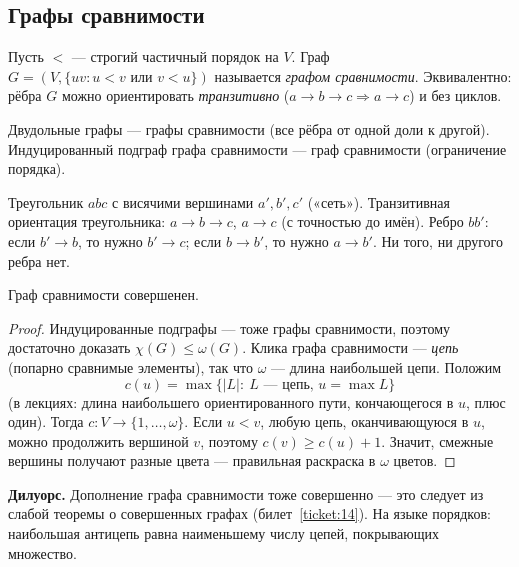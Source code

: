 \subsection*{Графы сравнимости}
\begin{definition}
Пусть \(<\) — строгий частичный порядок на \(V\). Граф \(G=(V,\{uv: u<v\text{ или }v<u\})\)
называется \emph{графом сравнимости}. Эквивалентно: рёбра \(G\) можно ориентировать
\emph{транзитивно} (\(a\to b\to c\Rightarrow a\to c\)) и без циклов.
\end{definition}
Двудольные графы — графы сравнимости (все рёбра от одной доли к другой).
Индуцированный подграф графа сравнимости — граф сравнимости (ограничение порядка).

\begin{example}
Треугольник \(abc\) с висячими вершинами \(a',b',c'\) («сеть»). Транзитивная ориентация
треугольника: \(a\to b\to c\), \(a\to c\) (с точностью до имён). Ребро \(bb'\): если \(b'\to b\),
то нужно \(b'\to c\); если \(b\to b'\), то нужно \(a\to b'\). Ни того, ни другого ребра нет.
\end{example}
\begin{theorem}[Мирский, 1971]
Граф сравнимости совершенен.
\end{theorem}
\begin{proof}
Индуцированные подграфы — тоже графы сравнимости, поэтому достаточно доказать
\(\chi(G)\le\omega(G)\). Клика графа сравнимости — \emph{цепь} (попарно сравнимые элементы),
так что \(\omega\) — длина наибольшей цепи. Положим
\[
c(u)=\max\bigl\{|L|:\ L\text{ — цепь, }u=\max L\bigr\}
\]
(в лекциях: длина наибольшего ориентированного пути, кончающегося в \(u\), плюс один).
Тогда \(c\colon V\to\{1,\ldots,\omega\}\). Если \(u<v\), любую цепь, оканчивающуюся в \(u\),
можно продолжить вершиной \(v\), поэтому \(c(v)\ge c(u)+1\). Значит, смежные вершины
получают разные цвета — правильная раскраска в \(\omega\) цветов.
\end{proof}
\begin{tcolorbox}[colback=cbGrayBack,colframe=cbGray!55]
\textbf{Дилуорс.} Дополнение графа сравнимости тоже совершенно — это следует из
слабой теоремы о совершенных графах (билет~\ref{ticket:14}). На языке порядков:
наибольшая антицепь равна наименьшему числу цепей, покрывающих множество.
\end{tcolorbox}

